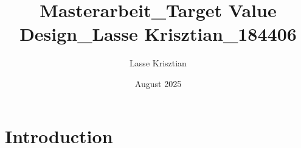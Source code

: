 \documentclass[12pt,a4paper,oneside,ngerman]{scrreprt}
\title{Masterarbeit_Target Value Design_Lasse Krisztian_184406}
\author{Lasse Krisztian}
\date{August 2025}
\begin{document}
\maketitle

\section{Introduction}
\end{document}
